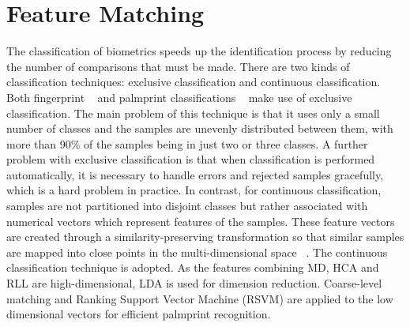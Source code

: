 \section{Feature Matching}
\label{sec:methodology:featurematch}

The classification of biometrics speeds up the identification process by reducing the number of comparisons that must be made. There are two kinds of classification techniques: exclusive classification and continuous classification. Both fingerprint ~\cite{Henry:1900vc} and palmprint classifications ~\cite{Wu:2004kx} make use of exclusive classification. The main problem of this technique is that it uses only a small number of classes and the samples are unevenly distributed between them, with more than 90\% of the samples being in just two or three classes. A further problem with exclusive classification is that when classification is performed automatically, it is necessary to handle errors and rejected samples gracefully, which is a hard problem in practice. In contrast, for continuous classification, samples are not partitioned into disjoint classes but rather associated with numerical vectors which represent features of the samples. These feature vectors are created through a similarity-preserving transformation so that similar samples are mapped into close points in the multi-dimensional space ~\cite{Maltoni:wn}. The continuous classification technique is adopted. As the features combining MD, HCA and RLL are high-dimensional, LDA is used for dimension reduction. Coarse-level matching and Ranking Support Vector Machine (RSVM) are applied to the low dimensional vectors for efficient palmprint recognition.




